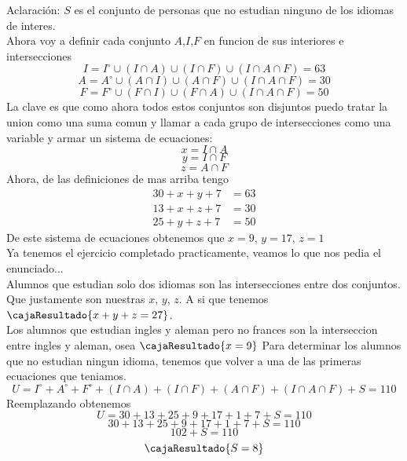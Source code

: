 \begin{enumerate}[label=\alph*)]
    Aclaración: $S$ es el conjunto de personas que no estudian ninguno de los idiomas de interes. \\
    Ahora voy a definir cada conjunto $A$,$I$,$F$ en funcion de sus interiores e intersecciones
    \[I = I^\circ \cup (I \cap A) \cup (I \cap F) \cup (I \cap A \cap F) = 63\]
    \[A = A^\circ \cup (A \cap I) \cup (A \cap F) \cup (I \cap A \cap F) = 30\]
    \[F = F^\circ \cup (F \cap I) \cup (F \cap A) \cup (I \cap A \cap F) = 50\]
    La clave es que como ahora todos estos conjuntos son disjuntos puedo tratar la union como una
    suma comun y llamar a cada grupo de intersecciones como una variable y armar un sistema de ecuaciones:
    \[x = I \cap A\]
    \[y = I \cap F\]
    \[z = A \cap F\]
    Ahora, de las definiciones de mas arriba tengo
    \begin{align*}
        30 + x + y + 7 &= 63 \\
        13 + x + z + 7 &= 30 \\
        25 + y + z + 7 &= 50
    \end{align*}
    De este sistema de ecuaciones obtenemos que $x = 9$, $y = 17$, $z = 1$ \\
    Ya tenemos el ejercicio completado practicamente, veamos lo que nos pedia el enunciado... \\
    Alumnos que estudian solo dos idiomas son las intersecciones entre dos conjuntos. Que justamente
    son nuestras $x$, $y$, $z$. A si que tenemos $\cajaResultado{x + y + z = 27}$. \\
    Los alumnos que estudian ingles y aleman pero no frances son la interseccion entre ingles y aleman, osea $\cajaResultado{x = 9}$
    Para determinar los alumnos que no estudian ningun idioma, tenemos que volver a una de las primeras ecuaciones que teniamos. 
    \[U = I^\circ + A^\circ + F^\circ + (I \cap A)+ (I \cap F) + (A \cap F) + (I \cap A \cap F) + S = 110\]
    Reemplazando obtenemos
    \[U = 30 + 13 + 25 + 9 + 17 + 1 + 7 + S = 110\]
    \[30 + 13 + 25 + 9 + 17 + 1 + 7 + S = 110\]
    \[102 + S = 110\]
    \[\cajaResultado{S = 8}\]


    

\end{enumerate}
